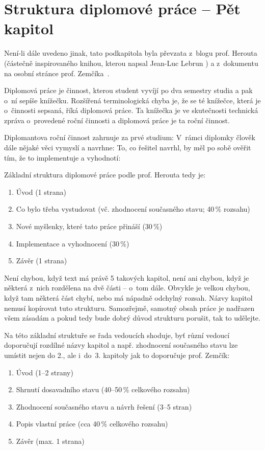 \section{Struktura diplomové práce -- Pět kapitol}
Není-li dále uvedeno jinak, tato podkapitola byla převzata z~blogu prof. Herouta \cite{Herout} (částečně inspirovaného knihou, kterou napsal Jean-Luc Lebrun \cite{Lebrun2011}) a z~dokumentu na osobní stránce prof. Zemčíka~\cite{Zemcik}.
\bigskip

Diplomová práce je činnost, kterou student vyvíjí po dva semestry studia a pak o~ní sepíše knížečku. Rozšířená terminologická chyba je, že se té knížečce, která je o~činnosti sepsaná, říká diplomová práce. Ta knížečka je ve skutečnosti technická zpráva o~provedené roční činnosti a diplomová práce je ta roční činnost.

Diplomantova roční činnost zahrnuje za prvé studium:  V~rámci diplomky člověk dále nějaké věci vymyslí a navrhne:  To, co řešitel navrhl, by měl po sobě ověřit tím, že to implementuje a vyhodnotí: 

Základní struktura diplomové práce podle prof. Herouta tedy je:
\begin{enumerate}
  \item{Úvod (1 strana)}
  \item{Co bylo třeba vystudovat (vč. zhodnocení současného stavu; 40\,\% rozsahu)}
  \item{Nové myšlenky, které tato práce přináší (30\,\%)}
  \item{Implementace a vyhodnocení (30\,\%)}
  \item{Závěr (1 strana)}
\end{enumerate}

Není chybou, když text má právě 5 takových kapitol, není ani chybou, když je některá z~nich rozdělena na dvě části -- o~tom dále. Obvykle je velkou chybou, když tam některá část chybí, nebo má nápadně odchylný rozsah. Názvy kapitol nemusí kopírovat tuto strukturu. Samozřejmě, samotný obsah práce je nadřazen všem zásadám a pokud tedy bude dobrý důvod strukturu porušit, tak to udělejte.

Na této základní struktuře se řada vedoucích shoduje, byť různí vedoucí doporučují rozdílné názvy kapitol a např. zhodnocení současného stavu lze umístit nejen do 2., ale i~do~3. kapitoly jak to doporučuje prof. Zemčík:
\begin{enumerate}
  \item{Úvod (1--2 strany)}
  \item{Shrnutí dosavadního stavu (40--50\,\% celkového rozsahu)}
  \item{Zhodnocení současného stavu a návrh řešení (3--5 stran)}
  \item{Popis vlastní práce (cca 40\,\% celkového rozsahu)}
  \item{Závěr (max. 1 strana)}
\end{enumerate}

